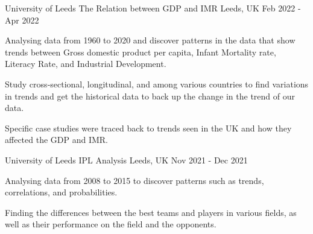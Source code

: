 

\begin{cventries}

  \cventry
    {University of Leeds} %
    {The Relation between GDP and IMR} %
    {Leeds, UK} %
    {Feb 2022 - Apr 2022} %
    {
      \begin{cvitems} %
        \item {Analysing data from 1960 to 2020 and discover patterns in the data that show trends between Gross domestic product per capita, Infant Mortality rate, Literacy Rate, and Industrial Development.}
        \item {Study cross‑sectional, longitudinal, and among various countries to find variations in trends and get the historical data to back up the change in the trend of our data.}
        \item {Specific case studies were traced back to trends seen in the UK and how they affected the GDP and IMR.}
      \end{cvitems}
    }


  \cventry
    {University of Leeds} %
    {IPL Analysis} %
    {Leeds, UK} %
    {Nov 2021 - Dec 2021} %
    {
      \begin{cvitems} %
        \item {Analysing data from 2008 to 2015 to discover patterns such as trends, correlations, and probabilities.}
        \item {Finding the differences between the best teams and players in various fields, as well as their performance on the field and the opponents.}
      \end{cvitems}
    }


\end{cventries}

